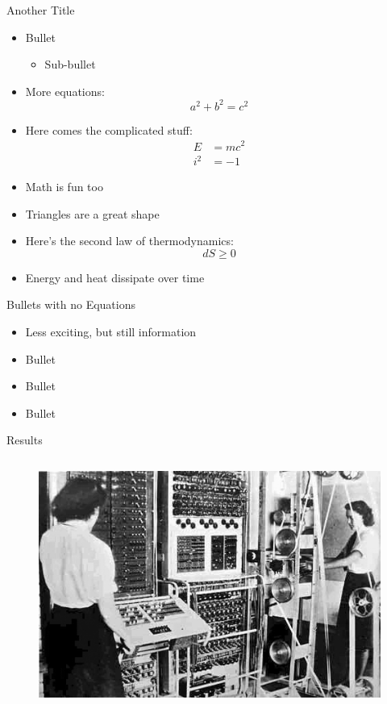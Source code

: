 \documentclass[final]{beamer}
\begin{document}
\begin{frame}{}
\begin{columns}[t]
      	\begin{column}{.3\linewidth}
            \begin{block}{Another Title}
	\begin{itemize}
	\item{Bullet}
		\begin{itemize}
		\item{Sub-bullet}
		\end{itemize}
	\item{More equations:}
		\begin{equation*}
		a^2 + b^2 = c^2
		\end{equation*}
	\item{Here comes the complicated stuff:}
		\begin{equation*}
		\begin{aligned}
		E &= mc^2 \\
		i^2 &= -1
		\end{aligned}
		\end{equation*}
	\item{Math is fun too}
	\item{Triangles are a great shape}
	\item{Here's the second law of thermodynamics:}
		\begin{equation*} 
		dS \geq 0
		\end{equation*}
	\item{Energy and heat dissipate over time}
	\end{itemize}
            \end{block}
		\vfill
        	\begin{block}{\large Bullets with no Equations}
          		\begin{itemize}
			\item{Less exciting, but still information}
			\item{Bullet}
			\item{Bullet}
			\item{Bullet}
			\end{itemize}
        	\end{block}
			\vfill
		\begin{block}{\large Results}
\begin{columns}
	\begin{figure}[h!]
	\includegraphics[width=6in]{Colossus.jpg}

\end{figure}
\end{columns}
\end{block}
\end{column}
\end{columns}
\end{frame}
\end{document}
